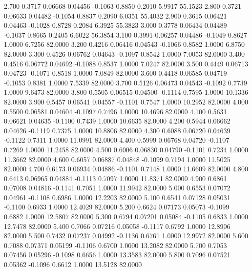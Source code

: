    2.700   0.3717   0.06668   0.04456  -0.1063   0.8850   0.2010   5.9917  55.1523
   2.800   0.3721   0.06633   0.04482  -0.1054   0.8837   0.2090   6.0351  55.4032
   2.900   0.3615   0.06421   0.04463  -0.1028   0.8728   0.2084   6.3925  55.3823
   3.000   0.3778   0.06434   0.04489  -0.1037   0.8665   0.2405   6.6022  56.3854
   3.100   0.3991   0.06257   0.04486  -0.1049   0.8627   1.0000   6.7256  82.0000
   3.200   0.4216   0.06416   0.04543  -0.1066   0.8582   1.0000   6.8750  82.0000
   3.300   0.4526   0.06762   0.04643  -0.1097   0.8542   1.0000   7.0053  82.0000
   3.400   0.4516   0.06772   0.04692  -0.1088   0.8537   1.0000   7.0247  82.0000
   3.500   0.4449   0.06713   0.04723  -0.1071   0.8518   1.0000   7.0849  82.0000
   3.600   0.4418   0.06585   0.04719  -0.1053   0.8381   1.0000   7.5339  82.0000
   3.700   0.5126   0.06473   0.04543  -0.1092   0.7739   1.0000   9.6473  82.0000
   3.800   0.5505   0.06515   0.04500  -0.1114   0.7595   1.0000  10.1336  82.0000
   3.900   0.5457   0.06541   0.04557  -0.1101   0.7547   1.0000  10.2952  82.0000
   4.000   0.5500   0.06581   0.04604  -0.1097   0.7496   1.0000  10.4696  82.0000
   4.100   0.5631   0.06621   0.04635  -0.1100   0.7439   1.0000  10.6635  82.0000
   4.200   0.5944   0.06662   0.04626  -0.1119   0.7375   1.0000  10.8806  82.0000
   4.300   0.6088   0.06720   0.04639  -0.1122   0.7311   1.0000  11.0991  82.0000
   4.400   0.5999   0.06768   0.04720  -0.1107   0.7269   1.0000  11.2458  82.0000
   4.500   0.6006   0.06830   0.04790  -0.1101   0.7234   1.0000  11.3662  82.0000
   4.600   0.6057   0.06887   0.04848  -0.1099   0.7194   1.0000  11.5025  82.0000
   4.700   0.6173   0.06934   0.04886  -0.1101   0.7148   1.0000  11.6609  82.0000
   4.800   0.6413   0.06965   0.04884  -0.1113   0.7097   1.0000  11.8371  82.0000
   4.900   0.6861   0.07008   0.04816  -0.1141   0.7051   1.0000  11.9942  82.0000
   5.000   0.6553   0.07072   0.04961  -0.1108   0.6986   1.0000  12.2203  82.0000
   5.100   0.6541   0.07128   0.05031  -0.1100   0.6933   1.0000  12.4029  82.0000
   5.200   0.6624   0.07173   0.05073  -0.1099   0.6882   1.0000  12.5807  82.0000
   5.300   0.6794   0.07201   0.05084  -0.1105   0.6833   1.0000  12.7478  82.0000
   5.400   0.7066   0.07216   0.05058  -0.1117   0.6792   1.0000  12.8906  82.0000
   5.500   0.7432   0.07237   0.04992  -0.1136   0.6761   1.0000  12.9972  82.0000
   5.600   0.7088   0.07371   0.05199  -0.1106   0.6700   1.0000  13.2082  82.0000
   5.700   0.7053   0.07456   0.05296  -0.1098   0.6656   1.0000  13.3583  82.0000
   5.800   0.7096   0.07521   0.05362  -0.1096   0.6612   1.0000  13.5128  82.0000
